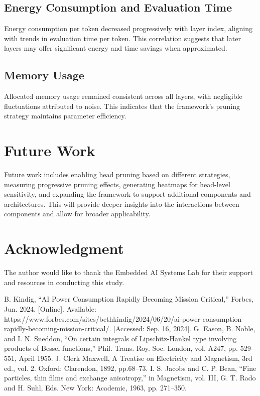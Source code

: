\documentclass[conference]{IEEEtran}
\begin{document}
    \subsection{Energy Consumption and Evaluation Time}
    Energy consumption per token decreased progressively with layer index, aligning with trends in evaluation time per token. This correlation suggests that later layers may offer significant energy and time savings when approximated.

    \subsection{Memory Usage}
    Allocated memory usage remained consistent across all layers, with negligible fluctuations attributed to noise. This indicates that the framework's pruning strategy maintains parameter efficiency.

    \section{Future Work}
    Future work includes enabling head pruning based on different strategies, measuring progressive pruning effects, generating heatmaps for head-level sensitivity, and expanding the framework to support additional components and architectures. This will provide deeper insights into the interactions between components and allow for broader applicability.

    \section*{Acknowledgment}
    The author would like to thank the Embedded AI Systems Lab for their support and resources in conducting this study.

    \begin{thebibliography}{00}

         B. Kindig, ``AI Power Consumption Rapidly Becoming Mission Critical,'' Forbes, Jun. 2024. [Online]. Available: https://www.forbes.com/sites/bethkindig/2024/06/20/ai-power-consumption-rapidly-becoming-mission-critical/. [Accessed: Sep. 16, 2024].
         G. Eason, B. Noble, and I. N. Sneddon, ``On certain integrals of Lipschitz-Hankel type involving products of Bessel functions,'' Phil. Trans. Roy. Soc. London, vol. A247, pp. 529--551, April 1955.
         J. Clerk Maxwell, A Treatise on Electricity and Magnetism, 3rd ed., vol. 2. Oxford: Clarendon, 1892, pp.68--73.
         I. S. Jacobs and C. P. Bean, ``Fine particles, thin films and exchange anisotropy,'' in Magnetism, vol. III, G. T. Rado and H. Suhl, Eds. New York: Academic, 1963, pp. 271--350.
    \end{thebibliography}
\end{document}
